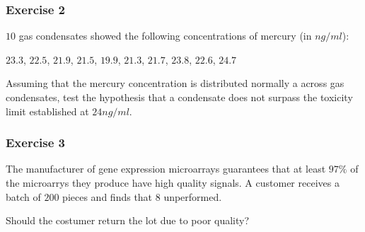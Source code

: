 \documentclass[
]{book}
\begin{document}
\hypertarget{exercise-2-10}{%
\subsubsection{Exercise 2}\label{exercise-2-10}}

\(10\) gas condensates showed the following concentrations of mercury (in \(ng/ml\)):

\(23.3\), \(22.5\), \(21.9\), \(21.5\), \(19.9\), \(21.3\), \(21.7\), \(23.8\), \(22.6\), \(24.7\)

Assuming that the mercury concentration is distributed normally a across gas condensates, test the hypothesis that a condensate does not surpass the toxicity limit established at \(24 ng/ml\).

\hypertarget{exercise-3-7}{%
\subsubsection{Exercise 3}\label{exercise-3-7}}

The manufacturer of gene expression microarrays guarantees that at least \(97\%\) of the microarrys they produce have high quality signals. A customer receives a batch of \(200\) pieces and finds that \(8\) unperformed.

Should the costumer return the lot due to poor quality?

  
\end{document}
